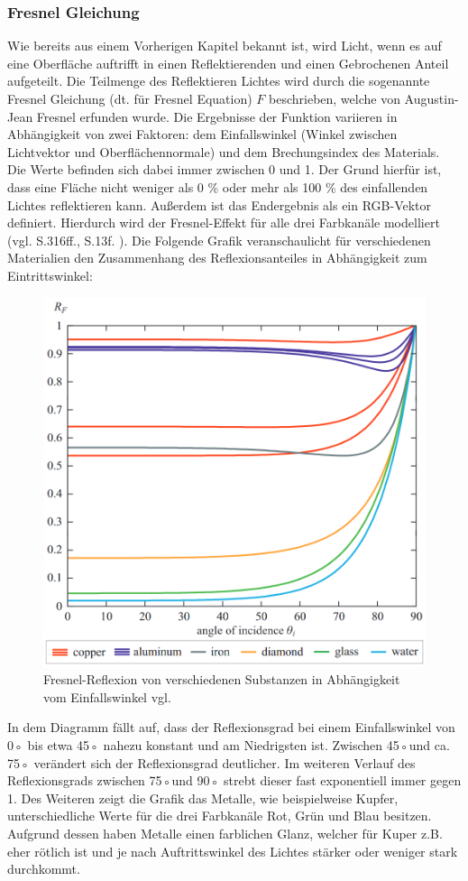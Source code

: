 \documentclass[
  11pt,
  a4paper,
  oneside
  ]{article}
\begin{document}
\subsubsection{Fresnel Gleichung}
Wie bereits aus einem Vorherigen Kapitel bekannt ist, wird Licht, wenn es auf eine Oberfläche auftrifft in einen Reflektierenden und einen Gebrochenen Anteil aufgeteilt. Die Teilmenge des Reflektieren Lichtes wird durch die sogenannte Fresnel Gleichung (dt. für Fresnel Equation) $F$ beschrieben, welche von Augustin-Jean Fresnel erfunden wurde. Die Ergebnisse der Funktion variieren in Abhängigkeit von zwei Faktoren: dem Einfallswinkel (Winkel zwischen Lichtvektor und Oberflächennormale) und dem Brechungsindex des Materials. Die Werte befinden sich dabei immer zwischen 0 und 1. Der Grund hierfür ist, dass eine Fläche nicht weniger als 0 \% oder mehr als 100 \% des einfallenden Lichtes reflektieren kann. Außerdem ist das Endergebnis als ein RGB-Vektor definiert. Hierdurch wird der Fresnel-Effekt für alle drei Farbkanäle modelliert 
(vgl. S.316ff.\cite{realTimeRendering4th}, S.13f. \cite{rtrPaper}). Die Folgende Grafik veranschaulicht für verschiedenen Materialien den Zusammenhang des Reflexionsanteiles in Abhängigkeit zum Eintrittswinkel:
\begin{figure}[H]
  \centering
  \includegraphics*[width=0.70 \textwidth]{images/fresnelDiagram.png}
  \caption{Fresnel-Reflexion von verschiedenen Substanzen in Abhängigkeit vom Einfallswinkel vgl. \cite{learnOpenGL}}
  \label{fig:img5}
\end{figure}

In dem Diagramm fällt auf, dass der Reflexionsgrad bei einem Einfallswinkel von 0◦ bis etwa 45◦ nahezu konstant und am Niedrigsten ist.  Zwischen 45◦und ca. 75◦ verändert sich der Reflexionsgrad deutlicher. Im weiteren Verlauf des Reflexionsgrads zwischen 75◦und 90◦ strebt dieser fast exponentiell immer gegen 1. Des Weiteren zeigt die Grafik das Metalle, wie beispielweise Kupfer, unterschiedliche Werte für die drei Farbkanäle Rot, Grün und Blau besitzen. Aufgrund dessen haben Metalle einen farblichen Glanz, welcher für Kuper z.B. eher rötlich ist und je nach Auftrittswinkel des Lichtes stärker oder weniger stark durchkommt. 
\end{document}
